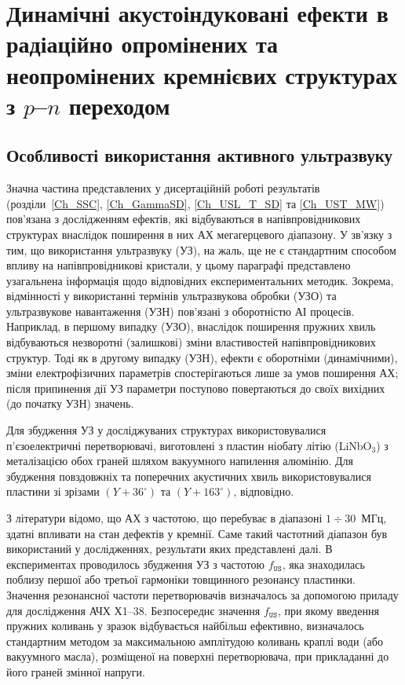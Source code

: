 
\chapter{Динамічні акустоіндуковані ефекти в радіаційно опромінених та неопромінених кремнієвих структурах з $p$--$n$ переходом\label{Ch_SSC}}


\section{Особливості використання активного ультразвуку}
Значна частина представлених у дисертаційній роботі результатів (розділи~\ref{Ch_SSC}, \ref{Ch_GammaSD}, \ref{Ch_USL_T_SD} та \ref{Ch_UST_MW}) пов'язана з дослідженням ефектів, які відбуваються в напівпровідникових структурах внаслідок
поширення в них АХ мегагерцевого діапазону.
У зв'язку з тим, що використання ультразвуку (УЗ), на жаль, ще не є стандартним способом впливу на напівпровідникові кристали,
у цьому параграфі представлено узагальнена  інформація щодо відповідних експериментальних методик.
Зокрема,
відмінності у використанні термінів ультразвукова обробки (УЗО) та ультразвукове навантаження (УЗН) пов'язані з оборотністю АІ процесів.
Наприклад, в першому випадку (УЗО), внаслідок поширення пружних хвиль відбуваються незворотні (залишкові) зміни властивостей напівпровідникових структур.
Тоді як в другому випадку (УЗН), ефекти є оборотніми (динамічними), зміни електрофізичних параметрів спостерігаються лише за умов поширення АХ;
після припинення дії УЗ параметри поступово повертаються до своїх вихідних (до початку УЗН) значень.

Для збудження УЗ у досліджуваних структурах використовувалися п'єзоелектричні перетворювачі,
виготовлені з пластин ніобату літію (LiNbO$_3$) з металізацією обох граней шляхом вакуумного напилення алюмінію.
Для збудження повздовжніх та поперечних акустичних хвиль використовувалися пластини зі зрізами $(Y\!+\!36^\circ)$ та $(Y\!+\!163^\circ)$, відповідно.

З літератури \cite{Ostapenko1995,Davletova2008,Davletova2009,Pashaev2014r} відомо, що АХ з частотою, що перебуває в діапазоні $1\div30$~МГц, здатні впливати на стан дефектів у кремнії.
Саме такий частотний діапазон був використаний у дослідженнях, результати яких представлені далі.
В експериментах проводилось збудження УЗ з частотою $f_\mathtt{US}$, яка знаходилась поблизу першої або третьої гармоніки товщинного резонансу пластинки.
Значення резонансної частоти перетворювачів визначалось за допомогою приладу для дослідження АЧХ Х1--38.
Безпосереднє значення $f_\mathtt{US}$, при якому введення пружних коливань у зразок відбувається найбільш ефективно, визначалось стандартним методом за максимальною амплітудою коливань краплі води (або вакуумного масла), розміщеної на поверхні перетворювача, при прикладанні до його граней змінної напруги.

